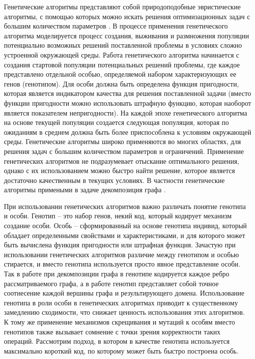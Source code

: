 Генетические алгоритмы представляют собой природоподобные эвристические алгоритмы, с помощью которых можно искать решения оптимизационных задач с большим количеством параметров \cite{Chahar2021Gen}.
В процессе применения генетического алгоритма моделируется процесс создания, выживания и размножения популяции потенциально возможных решений поставленной проблемы в условиях сложно устроенной окружающей среды.
Работа генетического алгоритма начинается с создания стартовой популяции потенциальных решений проблемы, где каждое представлено отдельной особью, определяемой набором характеризующих ее генов (генотипом).
Для особи должна быть определена функция пригодности, которая является индикатором качества для решения поставленной задачи (вместо функции пригодности можно использовать штрафную функцию, которая наоборот является показателем непригодности). 
На каждой эпохе генетического алгоритма на основе текущей популяции создается следующая популяция, которая по ожиданиям в среднем должна быть более приспособлена к условиям окружающей среды.
Генетические алгоритмы широко применяются во многих областях, для решения задач с большим количеством параметров и ограничений.
Применение генетических алгоритмов не подразумевает отыскание оптимального решения, однако с их использованием можно быстро найти решение, которое является достаточно качественным в текущих условиях.
В частности генетические алгоритмы примеными в задаче декомпозиция графа \cite{Chaouche2023Graph,Li2020Graph}.

При использовании генетических алгоритмов важно различать понятие генотипа и особи.
Генотип -- это набор генов, некий код, который кодирует механизм создание особи.
Особь -- сформированный на основе генотипа индивид, который обладает определенными свойствами и характеристиками, и для которого может быть вычислена функция пригодности или штрафная функция.
Зачастую при использовании генетических алгоритмов различие между генотипом и особью стирается, и вместо генотипа используется просто явное представление особи.
Так в работе \cite{Chaouche2023Graph} при декомпозиции графа в генотипе кодируется каждое ребро рассматриваемого графа, а в работе \cite{Li2020Graph} генотип представляет собой точное соотнесение каждой вершины графа и результирующего домена.
Использование генотипа в роли особи в генетических алгоритмах приводит к существенному замедлению сходимости, что снижает ценность использования этих алгоритмов.
К тому же применение механизмов скрещивания и мутаций к особям вместо генотипов также вызывает сомнение с точки зрения корректности таких операций.
Рассмотрим подход, в котором в качестве генотипа используется максимально короткий код, по которому может быть быстро построена особь.

